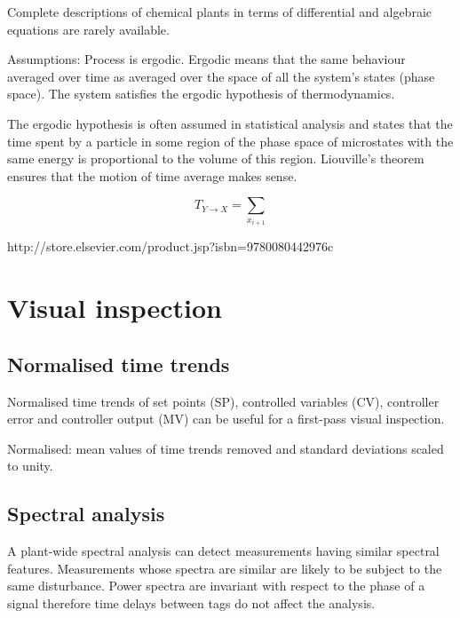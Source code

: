 \documentclass[a4paper]{book}
\begin{document}
Complete descriptions of chemical plants in terms of differential and algebraic equations are rarely available.


Assumptions:
Process is ergodic.
Ergodic means that the same behaviour averaged over time as averaged over the space of all the system's states (phase space).
The system satisfies the ergodic hypothesis of thermodynamics.

The ergodic hypothesis is often assumed in statistical analysis and states that the time spent by a particle in some region of the phase space of microstates with the same energy is proportional to the volume of this region.
Liouville's theorem ensures that the motion of time average makes sense.

\begin{equation}
  T_{Y\rightarrow X} = \sum_{x_{i+1}}
\end{equation}



http://store.elsevier.com/product.jsp?isbn=9780080442976c







\section{Visual inspection}

\subsection{Normalised time trends}

Normalised time trends of set points (SP), controlled variables (CV), controller error and controller output (MV) can be useful for a first-pass visual inspection.

Normalised: mean values of time trends removed and standard deviations scaled to unity.

\subsection{Spectral analysis}

A plant-wide spectral analysis can detect measurements having similar spectral features.
Measurements whose spectra are similar are likely to be subject to the same disturbance.
Power spectra are invariant with respect to the phase of a signal therefore time delays between tags do not affect the analysis.
\end{document}
